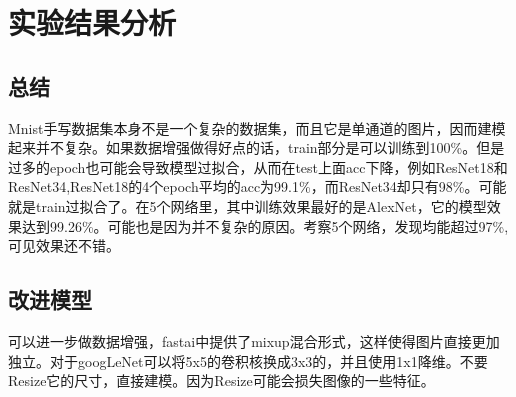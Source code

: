 \section{实验结果分析}
 \subsection{总结}
 Mnist手写数据集本身不是一个复杂的数据集，而且它是单通道的图片，因而建模起来并不复杂。如果数据增强做得好点的话，train部分是可以训练到100\%。但是过多的epoch也可能会导致模型过拟合，从而在test上面acc下降，例如ResNet18和ResNet34,ResNet18的4个epoch平均的acc为99.1\%，而ResNet34却只有98\%。可能就是train过拟合了。在5个网络里，其中训练效果最好的是AlexNet，它的模型效果达到99.26\%。可能也是因为并不复杂的原因。考察5个网络，发现均能超过97\%,可见效果还不错。
 \subsection{改进模型}
 可以进一步做数据增强，fastai中提供了mixup混合形式，这样使得图片直接更加独立。对于googLeNet可以将5x5的卷积核换成3x3的，并且使用1x1降维。不要Resize它的尺寸，直接建模。因为Resize可能会损失图像的一些特征。
 
  